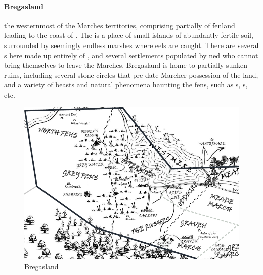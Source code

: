 \paragraph{Bregasland} the westernmost of the Marches territories, comprising partially of fenland leading to the coast of . The  is a place of small islands of abundantly fertile soil, surrounded by seemingly endless marshes where eels are caught. There are several s here made up entirely of , and several settlements populated by ned who cannot bring themselves to leave the Marches. Bregasland is home to partially sunken ruins, including several stone circles that pre-date Marcher possession of the land, and a variety of beasts and natural phenomena haunting the fens, such as s, s, etc. \begin{figure}\centering\includegraphics[width=16.3cm,angle=90]{atlasofthemarches/Bregasland}\caption{Bregasland}\end{figure}
